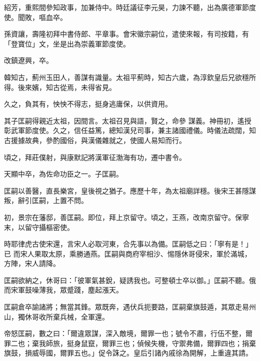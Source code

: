\begin{pinyinscope}
 紹芳，重熙間參知政事，加兼侍中。時廷議征李元昊，力諫不聽，出為廣德軍節度使。聞敗，嘔血卒。



 孫資讓，壽隆初拜中書侍郎、平章事。會宋徽宗嗣位，遣使來報，有司按籍，有「登寶位」文，坐是出為崇義軍節度使。



 改鎮遼興，卒。



 韓知古，薊州玉田人，善謀有識量。太祖平薊時，知古六歲，為淳欽皇后兄欲穩所得。後來嬪，知古從焉，未得省見。



 久之，負其有，怏怏不得志，挺身逃庸保，以供資用。



 其子匡嗣得親近太祖，因間言。太祖召見與語，賢之，命參
 謀義。神冊初，遙授彰武軍節度使。久之，信任益篤，總知漢兒司事，兼主諸國禮儀。時儀法疏闊，知古援據故典，參酌國俗，與漢儀雜就之，使國人易知而行。



 頃之，拜莊僕射，與康默記將漢軍征渤海有功，遷中書令。



 天顯中卒，為佐命功臣之一。子匡嗣。



 匡嗣以善醫，直長樂宮，皇後視之猶子。應歷十年，為太祖廟詳穩。後宋王甚隱謀叛，辭引匡嗣，上置不問。



 初，景宗在藩邸，善匡嗣。即位，拜上京留守。頃之，王燕，改南京留守。保寧末，以留守攝樞密使。



 時耶律虎古使宋還，言宋人必取河東，合先事以為備。匡嗣低之曰：「寧有是！」已
 而宋人果取太原，乘勝通燕。匡嗣與商府宰相沙、惕隱休哥侵宋，軍於滿城，方陣，宋人請降。



 匡嗣欲納之，休哥曰：「彼軍氣甚銳，疑誘我也。可整頓士卒以御。」匡嗣不聽。俄而宋軍鼓噪薄我，眾蹙踐，塵起漲天。



 匡嗣倉卒諭諸將；無當其鋒。眾既奔，遇伏兵扼要路，匡嗣棄旗鼓遁，其眾走易州山，獨休哥收所棄兵械，全軍還。



 帝怒匡嗣，數之曰：「爾違眾謀，深入敵境，爾罪一也；號令不肅，行伍不整，爾罪二也；棄我師旅，挺身鼠竄，爾罪三也；偵候失機，守禦弗備，爾罪四也；捐棄旗鼓，損威辱國，爾罪五也。」促令誅之。皇后引諸內戚徐為開解，上重違其請。




\end{pinyinscope}
